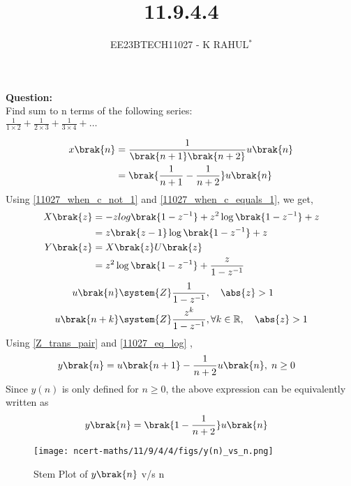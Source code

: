 \documentclass[journal,12pt,twocolumn]{IEEEtran}
\theoremstyle{remark}
\begin{document}

\vspace{3cm}
\title{11.9.4.4}
\author{EE23BTECH11027 - K RAHUL$^{*}$%
}
\maketitle
\newpage
\bigskip
\renewcommand{\thefigure}{\theenumi}
\renewcommand{\thetable}{\theenumi}
\textbf{Question:} \\
Find sum to n terms of the following series:\\
$\frac{1}{1 \times 2} + \frac{1}{2 \times 3} + \frac{1}{3 \times 4} + \ldots$
\bigskip \bigskip

\fi
\solution
\begin{table}[ht]

\end{table}
\begin{align}
x\brak{n} &= \frac{1}{\brak{n+1}\brak{n+2}}u\brak{n}\\
& = \brak{\frac{1}{n+1} - \frac{1}{n+2}}u\brak{n}
\end{align}
Using \eqref{11027_when_c_not_1} and \eqref{11027_when_c_equals_1}, we get,
\begin{align}X\brak{z} &= -z log\brak{1-z^{-1}} + z^2 \log\brak{1-z^{-1}} + z\\
&= z\brak{z-1}\log\brak{1-z^{-1}} + z\\
    Y\brak{z} &= X\brak{z}U\brak{z}\\
     &=z^2\log\brak{1-z^{-1}} + \frac{z}{1-z^{-1}}
\end{align}
\begin{align}
	u\brak{n} &\system{Z} \frac{1}{1-z^{-1}} , \quad \abs{z} > 1\\
	u\brak{n+k} &\system{Z} \frac{z^k}{1-z^{-1}}, \forall k\in \mathbb{R}, \quad \abs{z} > 1 \label{Z_trans_pair}
\end{align}
Using \eqref{Z_trans_pair} and \eqref{11027_eq_log} ,
\begin{align}
    y\brak{n} &= u\brak{n+1} - \frac{1}{n+2}u\brak{n} , \; n \geq 0
\end{align}
Since $y(n)$ is only defined for $n \geq 0$, the above expression can be equivalently written as
\begin{align}
	y\brak{n} &= \brak{1-\frac{1}{n+2}} u\brak{n}
\end{align}
\newpage
\begin{figure}[h]
    \texttt{[image: ncert-maths/11/9/4/4/figs/y(n)\_vs\_n.png]}\label{fig:stem-plot}
    \caption{Stem Plot of $y\brak{n}$ v/s n}
\end{figure}
\end{document}
